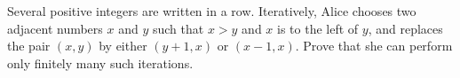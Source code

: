 Several positive integers are written in a row. Iteratively, Alice chooses two adjacent numbers 
$x$
 and 
$y$
 such that 
$x>y$
 and 
$x$
 is to the left of 
$y$, 
 and replaces the pair 
$(x,y)$
 by either 
$(y+1,x)$
 or 
$(x-1,x)$.
 Prove that she can perform only finitely many such iterations.
